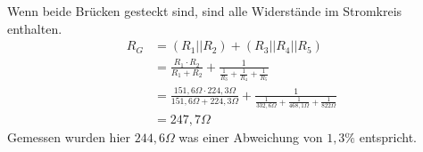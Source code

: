 \documentclass[
a4paper,     %
 headsepline, %
11pt         %
]{scrartcl}  %
\begin{document}
Wenn beide Brücken gesteckt sind, sind alle Widerstände im Stromkreis enthalten.
\begin{align}
R_G &= (R_1 || R_2) + (R_3 || R_4 || R_5) \nonumber \\
	&= \frac{R_1 \cdot R_2}{R_1+R_2} + \frac{1}{\frac{1}{R_3}+\frac{1}{R_4}+\frac{1}{R_5}} \nonumber \\
	&= \frac{151,6 \Omega \cdot 224,3 \Omega}{151,6 \Omega + 224,3 \Omega} + \frac{1}{\frac{1}{332,6 \Omega}+\frac{1}{468,1 \Omega}+\frac{1}{822 \Omega}}  \nonumber \\
	&= 247,7 \Omega \nonumber
\end{align}
Gemessen wurden hier $244,6 \Omega$ was einer Abweichung von $1,3\%$ entspricht.



% 

% 
\end{document}
